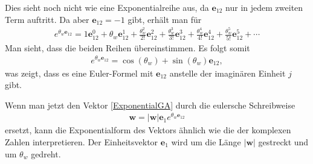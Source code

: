 Dies sieht noch nicht wie eine Exponentialreihe aus, da $\mathbf{e}_{12}$ nur in jedem zweiten Term auftritt. Da aber $\mathbf{e}_{12}=-1$ gibt, erhält man für
\begin{align}
e^{\theta_w\mathbf{e}_{12}} = 1 \mathbf{e}_{12}^0+\theta_w\mathbf{e}_{12}^1+{\frac {\theta_w^{2}}{2!}}\mathbf{e}_{12}^2+{\frac {\theta_w^{3}}{3!}}\mathbf{e}_{12}^3+{\frac {\theta_w^{4}}{4!}}\mathbf{e}_{12}^4+{\frac {\theta_w^{5}}{5!}}\mathbf{e}_{12}^5+\cdots
\label{ExponentialGA2}
\end{align}
Man sieht, dass die beiden Reihen übereinstimmen. Es folgt somit
\begin{align}\label{EulerGA}
e^{\theta_w \mathbf{e}_{12}} = \cos(\theta_w)+ \sin(\theta_w) \mathbf{e}_{12},
\end{align} 
was zeigt, dass es eine Euler-Formel mit $\mathbf{e}_{12}$ anstelle der imaginären Einheit $j$ gibt.

Wenn man jetzt den Vektor \eqref{ExponentialGA} durch die eulersche Schreibweise
\begin{align}
\mathbf{w} = |\mathbf{w}|\mathbf{e}_1e^{\theta_w\mathbf{e}_{12}}
\end{align}
ersetzt, kann die Exponentialform des Vektors ähnlich wie die der komplexen Zahlen interpretieren. Der Einheitsvektor $\mathbf{e}_1$ wird um die Länge $|\mathbf{w}|$ gestreckt und um $\theta_w$ gedreht.
